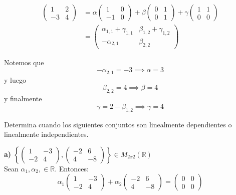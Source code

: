 \documentclass[letterpaper]{article}
\renewcommand{\*}{\cdot}
\theoremstyle{definition}
\begin{document}
\begin{align*}
 \begin{pmatrix} 
 1 & 2 \\ 
 -3 & 4 
 \end{pmatrix} &= \alpha \begin{pmatrix} 
 1 & 0 \\ 
 -1 & 0 
 \end{pmatrix}  + \beta \begin{pmatrix} 
 0 & 1 \\
 0 &1 
 \end{pmatrix}  + \gamma  \begin{pmatrix} 
 1 & 1 \\
 0 &0 
 \end{pmatrix} \\
  & = \begin{pmatrix} \alpha_{1,1}  + \gamma_{1,1} & \beta_{1,2} + \gamma_{1,2} \\ -\alpha_{2,1} & \beta_{2,2} \end{pmatrix}  
\end{align*}

Notemos que $$ -\alpha_{2,1} = -3  \implies  \alpha = 3$$ y luego 
$$\beta_{2,2} = 4 \implies \beta = 4 $$ y finalmente $$\gamma = 2 - \beta_{1,2} \implies \gamma = 4 $$

\begin{ejercicio}{7}
	Determina cuando los siguientes conjuntos son linealmente dependientes o linealmente independientes.
\end{ejercicio}


\textbf{a)} $\left \lbrace \begin{pmatrix} 1 & -3 \\ -2 & 4 \end{pmatrix} , \begin{pmatrix} -2 & 6 \\ 4 & -8 \end{pmatrix} \right \rbrace \in M_{2x2}(\mathbb{R})$\\

Sean $\alpha _1, \alpha _2, \in \mathbb{R}$. Entonces:\\

$$\alpha_1 \begin{pmatrix} 1 & -3 \\ -2 & 4 \end{pmatrix}  + \alpha_2 \begin{pmatrix} -2 & 6 \\ 4 & -8 \end{pmatrix} = \begin{pmatrix}
0 & 0 \\ 0 & 0 \end{pmatrix}$$
\end{document}
